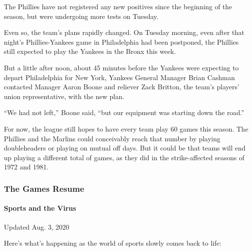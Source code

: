 The Phillies have not registered any new positives since the beginning
of the season, but were undergoing more tests on Tuesday.

Even so, the team's plans rapidly changed. On Tuesday morning, even
after that night's Phillies-Yankees game in Philadelphia had been
postponed, the Phillies still expected to play the Yankees in the Bronx
this week.

But a little after noon, about 45 minutes before the Yankees were
expecting to depart Philadelphia for New York, Yankees General Manager
Brian Cashman contacted Manager Aaron Boone and reliever Zack Britton,
the team's players' union representative, with the new plan.

``We had not left,'' Boone said, ``but our equipment was starting down
the road.''

For now, the league still hopes to have every team play 60 games this
season. The Phillies and the Marlins could conceivably reach that number
by playing doubleheaders or playing on mutual off days. But it could be
that teams will end up playing a different total of games, as they did
in the strike-affected seasons of 1972 and 1981.

\hypertarget{the-games-resume}{%
\subsubsection{The Games Resume}\label{the-games-resume}}

\hypertarget{sports-and-the-virus}{%
\paragraph{Sports and the Virus}\label{sports-and-the-virus}}

Updated Aug. 3, 2020

Here's what's happening as the world of sports slowly comes back to
life:

